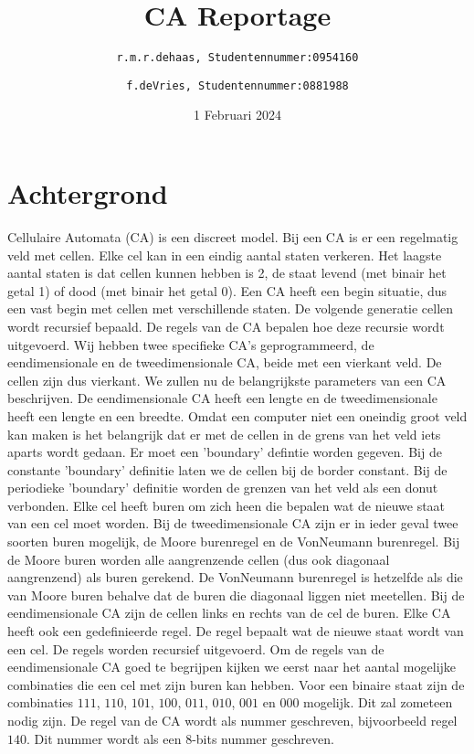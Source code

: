 \documentclass[12pt,a4paper]{article}
\title{CA Reportage}
\author{
\texttt{r.m.r.dehaas, \hspace{6pt} 
Studentennummer:\hspace{2pt}0954160}
\and
\texttt{f.deVries, \hspace{6pt}
Studentennummer:\hspace{2pt}0881988}}
\date{1 Februari 2024}
\begin{document}
\maketitle
\section*{Achtergrond}
Cellulaire Automata (CA) is een discreet model. 
Bij een CA is er een regelmatig veld met cellen. 
Elke cel kan in een eindig aantal staten verkeren.
Het laagste aantal staten is dat cellen kunnen hebben is 2,
de staat levend (met binair het getal 1) of dood (met binair het getal 0).
Een CA heeft een begin situatie, dus een vast begin met cellen met verschillende staten.
De volgende generatie cellen wordt recursief bepaald. 
De regels van de CA bepalen hoe deze recursie wordt uitgevoerd.
Wij hebben twee specifieke CA's geprogrammeerd, de eendimensionale en de
tweedimensionale CA, beide met een vierkant veld. 
De cellen zijn dus vierkant.
We zullen nu de belangrijkste parameters van een CA beschrijven.
De eendimensionale CA heeft een lengte en de tweedimensionale heeft een lengte en een breedte.
Omdat een computer niet een oneindig groot veld kan maken is het belangrijk dat 
er met de cellen in de grens van het veld iets aparts wordt gedaan. Er moet een 'boundary' defintie worden gegeven.
Bij de constante 'boundary' definitie laten we de cellen bij de border constant.
Bij de periodieke 'boundary' definitie worden de grenzen van het veld als een donut verbonden.
Elke cel heeft buren om zich heen die bepalen wat de nieuwe staat van een cel moet worden.
Bij de tweedimensionale CA zijn er in ieder geval twee soorten buren mogelijk, de Moore burenregel en de VonNeumann burenregel.
Bij de Moore buren worden alle aangrenzende cellen (dus ook diagonaal aangrenzend) als buren gerekend.
De VonNeumann burenregel is hetzelfde als die van Moore buren behalve dat de buren die diagonaal liggen niet meetellen.
Bij de eendimensionale CA zijn de cellen links en rechts van de cel de buren.
Elke CA heeft ook een gedefinieerde regel. De regel bepaalt wat de nieuwe staat wordt van een cel.
De regels worden recursief uitgevoerd.
Om de regels van de eendimensionale CA goed te begrijpen kijken we eerst naar het aantal mogelijke combinaties die een cel met zijn buren kan hebben.
Voor een binaire staat zijn de combinaties $111$, $110$, $101$, $100$, $011$, $010$, $001$ en $000$ mogelijk.
Dit zal zometeen nodig zijn.
De regel van de CA wordt als nummer geschreven, bijvoorbeeld regel $140$.
Dit nummer wordt als een 8-bits nummer geschreven. 
\end{document}
